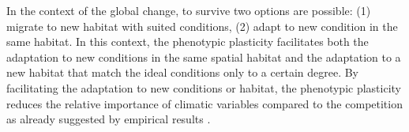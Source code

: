 In the context of the global change, to survive two options are possible: (1) migrate to new habitat with suited conditions, (2) adapt to new condition in the same habitat. In this context, the phenotypic plasticity facilitates both the adaptation to new conditions in the same spatial habitat and the adaptation to a new habitat that match the ideal conditions only to a certain degree. By facilitating the adaptation to new conditions or habitat, the phenotypic plasticity reduces the relative importance of climatic variables compared to the competition as already suggested by empirical results \parencite{alexander_novel_2015}.

%
 
 



%
%
% 


